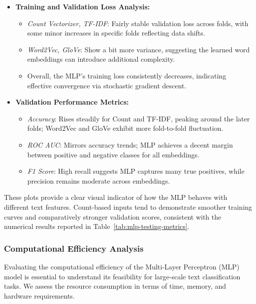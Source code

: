 \begin{itemize}
    \item \textbf{Training and Validation Loss Analysis:}
    \begin{itemize}
        \item \textit{Count Vectorizer, TF-IDF}: Fairly stable validation loss across folds, with some minor increases in specific folds reflecting data shifts.
        \item \textit{Word2Vec, GloVe}: Show a bit more variance, suggesting the learned word embeddings can introduce additional complexity.
        \item Overall, the MLP’s training loss consistently decreases, indicating effective convergence via stochastic gradient descent.
    \end{itemize}
    
    \item \textbf{Validation Performance Metrics:}
    \begin{itemize}
        \item \textit{Accuracy}: Rises steadily for Count and TF-IDF, peaking around the later folds; Word2Vec and GloVe exhibit more fold-to-fold fluctuation.
        \item \textit{ROC AUC}: Mirrors accuracy trends; MLP achieves a decent margin between positive and negative classes for all embeddings.
        \item \textit{F1 Score}: High recall suggests MLP captures many true positives, while precision remains moderate across embeddings.
    \end{itemize}
\end{itemize}

These plots provide a clear visual indicator of how the MLP behaves with different text features. 
Count-based inputs tend to demonstrate smoother training curves and comparatively stronger 
validation scores, consistent with the numerical results reported in Table~\ref{tab:mlp-testing-metrics}.

\subsubsection{Computational Efficiency Analysis}

Evaluating the computational efficiency of the Multi-Layer Perceptron (MLP) model is essential to understand its feasibility for large-scale text classification tasks. We assess the resource consumption in terms of time, memory, and hardware requirements.

